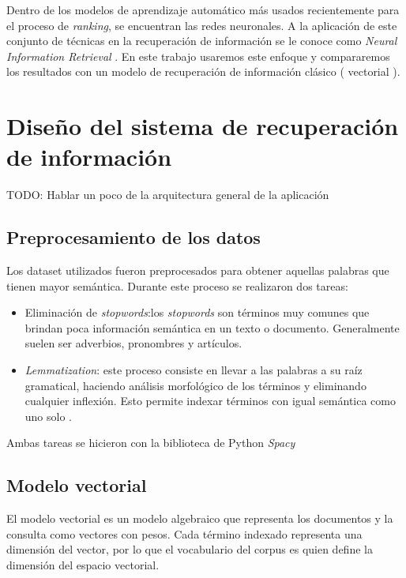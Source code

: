 \documentclass[12pt]{article}
\begin{document}
Dentro de los modelos de aprendizaje automático más usados recientemente para el proceso de \textit{ranking}, se encuentran las redes neuronales. A la aplicación de este conjunto de técnicas en la recuperación de información se le 
conoce como \textit{Neural Information Retrieval} \cite{mitra2018an}. En este trabajo usaremos este enfoque y compararemos los resultados
con un modelo de recuperación de información clásico ( vectorial ).


\section{Diseño del sistema de recuperación de información}

TODO: Hablar un poco de la arquitectura general de la aplicación

\subsection{Preprocesamiento de los datos}

Los dataset utilizados fueron preprocesados para obtener aquellas
palabras que tienen mayor semántica. Durante este proceso se
realizaron dos tareas:

\begin{itemize}
	\item Eliminación de \textit{stopwords}:los \textit{stopwords} son
		términos muy comunes que brindan poca información semántica
		en un texto o documento. Generalmente suelen ser adverbios,
		pronombres y artículos.
	\item \textit{Lemmatization}: este proceso consiste en llevar a las
		palabras a su raíz gramatical, haciendo análisis morfológico 
		de los términos y eliminando cualquier inflexión. Esto permite
		indexar términos con igual semántica como uno solo .
\end{itemize}

Ambas tareas se hicieron con la biblioteca de Python \textit{Spacy}

\subsection{Modelo vectorial}

El modelo vectorial\cite{vectormodel} es un modelo algebraico que representa los documentos
y la consulta como vectores con pesos. Cada término indexado representa
una dimensión del vector, por lo que el vocabulario del corpus es
quien define la dimensión del espacio vectorial.
\end{document}
